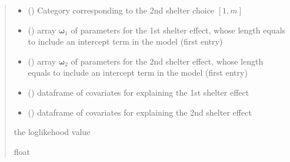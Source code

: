 \documentclass[letterpaper,10pt,english]{sphinxmanual}
\begin{document}
\begin{fulllineitems}
\begin{quote}
\begin{description}
\begin{itemize}
\item {} 
\sphinxAtStartPar
{} () \textendash{} Category corresponding to the 2nd shelter choice \([1,m]\)

\item {} 
\sphinxAtStartPar
{} () \textendash{} array \(\pmb \omega_1\) of parameters for the 1st shelter effect, whose length equals 
 to include an intercept term in the model (first entry)

\item {} 
\sphinxAtStartPar
{} () \textendash{} array \(\pmb \omega_2\) of parameters for the 2nd shelter effect, whose length equals 
 to include an intercept term in the model (first entry)

\item {} 
\sphinxAtStartPar
{} () \textendash{} dataframe of covariates for explaining the 1st shelter effect

\item {} 
\sphinxAtStartPar
{} () \textendash{} dataframe of covariates for explaining the 2nd shelter effect

\end{itemize}

\sphinxAtStartPar
the log\sphinxhyphen{}likehood value

\sphinxAtStartPar
float

\end{description}\end{quote}

\end{fulllineitems}

\end{document}
